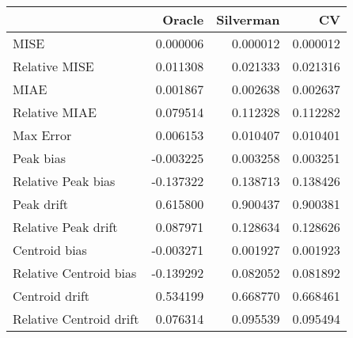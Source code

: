 \begin{tabular}{lrrr}
  \hline
 & Oracle & Silverman & CV \\ 
  \hline
MISE & 0.000006 & 0.000012 & 0.000012 \\ 
  Relative MISE & 0.011308 & 0.021333 & 0.021316 \\ 
  MIAE & 0.001867 & 0.002638 & 0.002637 \\ 
  Relative MIAE & 0.079514 & 0.112328 & 0.112282 \\ 
  Max Error & 0.006153 & 0.010407 & 0.010401 \\ 
  Peak bias & -0.003225 & 0.003258 & 0.003251 \\ 
  Relative Peak bias & -0.137322 & 0.138713 & 0.138426 \\ 
  Peak drift & 0.615800 & 0.900437 & 0.900381 \\ 
  Relative Peak drift & 0.087971 & 0.128634 & 0.128626 \\ 
  Centroid bias & -0.003271 & 0.001927 & 0.001923 \\ 
  Relative Centroid bias & -0.139292 & 0.082052 & 0.081892 \\ 
  Centroid drift & 0.534199 & 0.668770 & 0.668461 \\ 
  Relative Centroid drift & 0.076314 & 0.095539 & 0.095494 \\ 
   \hline
\end{tabular}
